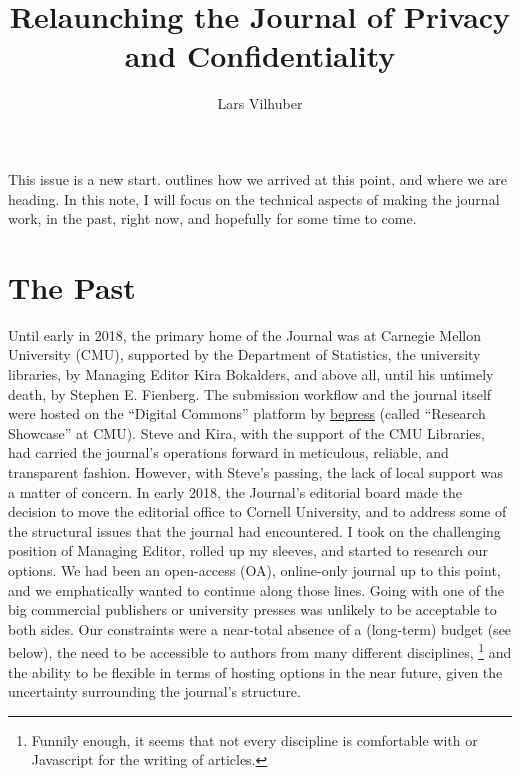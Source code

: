 \documentclass{jpcfinal} %
\begin{document}
\title[Relaunching JPC]{Relaunching the Journal of Privacy and Confidentiality}

\author{Lars Vilhuber}	%
\address{Managing Editor, Journal of Privacy and Confidentiality\newline 
Department of Economics, Cornell University}	%

\maketitle

This issue is a new start. \cite{DworkEditorial} outlines how we arrived at this point, and where we are heading. In this note, I will focus on the technical aspects of making the journal work, in the past, right  now, and hopefully for some time to come. 
\section{The Past}

Until early in 2018, the primary home of the Journal was at Carnegie Mellon University (CMU), supported by the Department of Statistics, the university libraries, by  Managing Editor Kira Bokalders, and above all, until his untimely death,  by Stephen E. Fienberg. The submission workflow and the journal itself were hosted on the ``Digital Commons'' platform by \href{https://www.bepress.com}{bepress} (called ``Research Showcase'' at CMU). Steve and Kira, with the support of the CMU Libraries, had carried the journal's operations forward in meticulous, reliable, and transparent fashion. However, with Steve's passing, the lack of local support was a matter of concern. In early 2018, the Journal's editorial board made the decision to move the editorial office to Cornell University, and to address some of the structural issues that the journal had encountered. I took on the challenging position of Managing Editor, rolled up my sleeves, and started to research our options. We had been an open-access (OA), online-only journal up to this point, and we emphatically wanted to continue along those lines. Going with one of the big commercial publishers or university presses was unlikely to be acceptable to both sides.  Our constraints were a near-total absence of a (long-term) budget (see below),  the need to be accessible to authors from many different disciplines,%
\footnote{Funnily enough, it seems that   not every discipline is comfortable with \LaTe{} or Javascript for the writing of articles.}
and the ability to be flexible in terms of hosting options in the near future, given the uncertainty surrounding the journal's structure.
\end{document}
